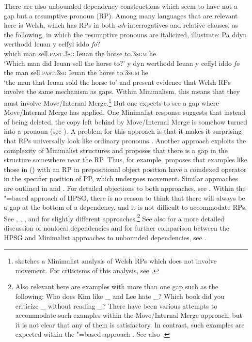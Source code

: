\documentclass[output=paper
	        ,collection
	        ,collectionchapter
 	        ,biblatex
                ,babelshorthands
                ,newtxmath
                ,draftmode
                ,colorlinks, citecolor=brown
]{langscibook}
\begin{document}
There are also unbounded dependency constructions which seem to have not a gap but a resumptive pronoun (RP). Among many languages that are relevant here is Welsh, which has RPs in both \emph{wh}-interrogatives and relative clauses, as the following, in which the resumptive pronouns are italicized, illustrate:
\eal
\ex
\gll Pa	ddyn werthodd Ieuan y ceffyl iddo \emph{fo}?\\
     which man sell.\textsc{past}.\textsc{3sg} Ieuan the horse to.\textsc{3sgm} he\\
\glt`Which man did Ieuan sell the horse to?'
\ex 
\gll y dyn werthodd Ieuan y ceffyl iddo \emph{fo}\\
the man sell.\textsc{past}.\textsc{3sg} Ieuan the horse to.\textsc{3sgm} he\\
\glt`the man that Ieuan sold the horse to'
\zl
\citet{Willis.2011} and \citet{Borsley.2010,Borsley2013a-u} present evidence that Welsh RPs involve
the same mechanism as gaps. Within Minimalism, this means that they must involve Move/Internal
Merge.\footnote{%
  \citet{Rouveret2008a-u} sketches a Minimalist analysis of Welsh RPs which does not involve movement. For
  criticisms of this analysis, see .
} But one expects to see a gap where Move/Internal Merge has applied. One Minimalist response
suggests that instead of being deleted, the copy left behind by Move/Internal Merge is somehow
turned into a pronoun (see \citealt{McCloskey.2006}). A problem for this approach is that it makes
it surprising that RPs universally look like ordinary pronouns \citep{McCloskey2002a-u}.
Another approach exploits the complexity of
Minimalist structures and proposes that there is a gap in the structure somewhere near the RP.
Thus, for example, \citet{Willis.2011} proposes that examples like those in () with an RP in
prepositional object position have a coindexed operator in the specifier position of PP, which
undergoes movement. Similar approaches are outlined in \citet{AounChoueiriHornstein2001a-u} and
\citet{Boeckx.2003}. For detailed objections to both approaches, see
\citet[Section~3]{Borsley2013a-u}. Within the \slasch"=based approach of HPSG, there is no reason to
think that there will always be a gap at the bottom of a dependency, and it is not difficult to
accommodate RPs. See \citet{Vaillette2001b}, \citet{Taghvaipour2010a-u}, \citet{Borsley2013a-u}, and \citet{crysmann_b10fg,Crysmann2016a-u} for slightly
different approaches.\footnote{%
	Also relevant here are examples with more than one gap such as the following:
	\eal
	\ex	Who does Kim like \_ and Lee hate \_?
	\ex	Which book did you criticize \_ without reading \_?
	\zl
	There have been various attempts to accommodate such examples within the Move/Internal Merge
        approach, but it is not clear that any of them is satisfactory. In contrast, such examples
        are expected within the \slasch"=based approach \citep{LS2003a-u}. See also \citet[Section~4.6]{ps2}.%
}
See also  for a more detailed discussion of nonlocal dependencies and for
further comparison between the HPSG and Minimalist approaches to unbounded dependencies, see
.
\end{document}
